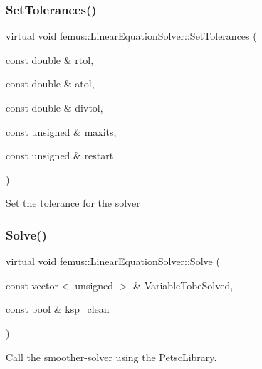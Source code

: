 \subsubsection{\texorpdfstring{Set\+Tolerances()}{SetTolerances()}}
{\footnotesize\ttfamily virtual void femus\+::\+Linear\+Equation\+Solver\+::\+Set\+Tolerances (\begin{DoxyParamCaption}\item[{const double \&}]{rtol,  }\item[{const double \&}]{atol,  }\item[{const double \&}]{divtol,  }\item[{const unsigned \&}]{maxits,  }\item[{const unsigned \&}]{restart }\end{DoxyParamCaption})\hspace{0.3cm}{\ttfamily [pure virtual]}}

Set the tolerance for the solver \mbox{\label{classfemus_1_1_linear_equation_solver_a3aeb1128e40d67fbdc16924b051696a3}} 
\subsubsection{\texorpdfstring{Solve()}{Solve()}}
{\footnotesize\ttfamily virtual void femus\+::\+Linear\+Equation\+Solver\+::\+Solve (\begin{DoxyParamCaption}\item[{const vector$<$ unsigned $>$ \&}]{Variable\+Tobe\+Solved,  }\item[{const bool \&}]{ksp\+\_\+clean }\end{DoxyParamCaption})\hspace{0.3cm}{\ttfamily [pure virtual]}}

Call the smoother-\/solver using the Petsc\+Library. \mbox{\label{classfemus_1_1_linear_equation_solver_a94ec3fe3a98e1201c3f192a86a249ce5}} 
